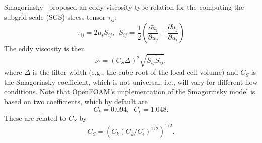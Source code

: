 Smagorinsky~\cite{Smagorinsky1963} proposed an eddy viscosity type relation for
the computing the subgrid scale (SGS) stress tensor $\tau_{ij}$:
\begin{equation}
    \tau_{ij} = 2 \mu_t S_{ij}, \, \, \,
    S_{ij} = \frac{1}{2}
    \left(
    \frac{\partial \tilde{u}_i}{\partial u_j}
    + \frac{\partial \tilde{u}_j}{\partial u_i}
    \right)
\end{equation}
The eddy viscosity is then
\begin{equation}
    \nu_t = (C_S \Delta)^2 \sqrt{\tilde{S}_{ij} \tilde{S}_{ij}},
\end{equation}
where $\Delta$ is the filter width (e.g., the cube root of the local cell
volume) and $C_S$ is the Smagorinsky coefficient, which is not universal, i.e.,
will vary for different flow conditions. Note that OpenFOAM's implementation of
the Smagorinsky model is based on two coefficients, which by default are
\begin{equation}
    C_k = 0.094, \, \, \,
    C_\epsilon = 1.048.
\end{equation}
These are related to $C_S$ by
\begin{equation}
    C_S =
    \left(
        C_k \left(C_k / C_\epsilon \right)^{1/2}
    \right)^{1/2}.
\end{equation}

